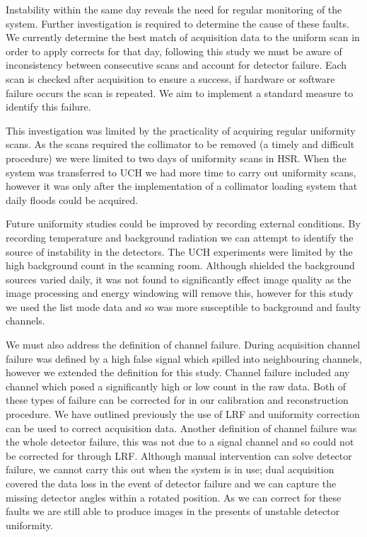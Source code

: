 Instability within the same day reveals the need for regular monitoring of the system. Further investigation is required to determine the cause of these faults. We currently determine the best match of acquisition data to the uniform scan in order to apply corrects for that day, following this study we must be aware of inconsistency between consecutive scans and account for detector failure. Each scan is checked after acquisition to ensure a success, if hardware or software failure occurs the scan is repeated. We aim to implement a standard measure to identify this failure. 

This investigation was limited by the practicality of acquiring regular uniformity scans. As the scans required the collimator to be removed (a timely and difficult procedure) we were limited to two days of uniformity scans in \acrshort{HSR}. When the system was transferred to \acrshort{UCH} we had more time to carry out uniformity scans, however it was only after the implementation of a collimator loading system that daily floods could be acquired. 

Future uniformity studies could be improved by recording external conditions. By recording temperature and background radiation we can attempt to identify the source of instability in the detectors. The \acrshort{UCH} experiments were limited by the high background count in the scanning room. Although shielded the background sources varied daily, it was not found to significantly effect image quality as the image processing and energy windowing will remove this, however for this study we used the list mode data and so was more susceptible to background and faulty channels. 

We must also address the definition of channel failure. During acquisition channel failure was defined by a high false signal which spilled into neighbouring channels, however we extended the definition for this study. Channel failure included any channel which posed a significantly high or low count in the raw data. Both of these types of failure can be corrected for in our calibration and reconstruction procedure. We have outlined previously the use of \acrshort{LRF} and uniformity correction can be used to correct acquisition data. Another definition of channel failure was the whole detector failure, this was not due to a signal channel and so could not be corrected for through \acrshort{LRF}. Although manual intervention can solve detector failure, we cannot carry this out when the system is in use; dual acquisition covered the data loss in the event of detector failure and we can capture the missing detector angles within a rotated position. As we can correct for these faults we are still able to produce images in the presents of unstable detector uniformity. 

